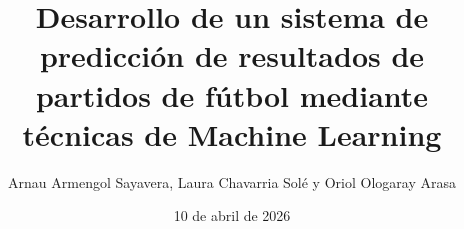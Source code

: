 \documentclass[11pt,a4paper,spanish,openany]{book}
\title{Desarrollo de un sistema de predicción de resultados de partidos de fútbol mediante técnicas de Machine Learning}
\author{Arnau Armengol Sayavera, Laura Chavarria Solé y Oriol Ologaray Arasa}
\date{10 de abril de 2026}
\begin{document}
\raggedbottom
\maketitle

\frontmatter




\tableofcontents
\listoftables

\mainmatter











\end{document}
